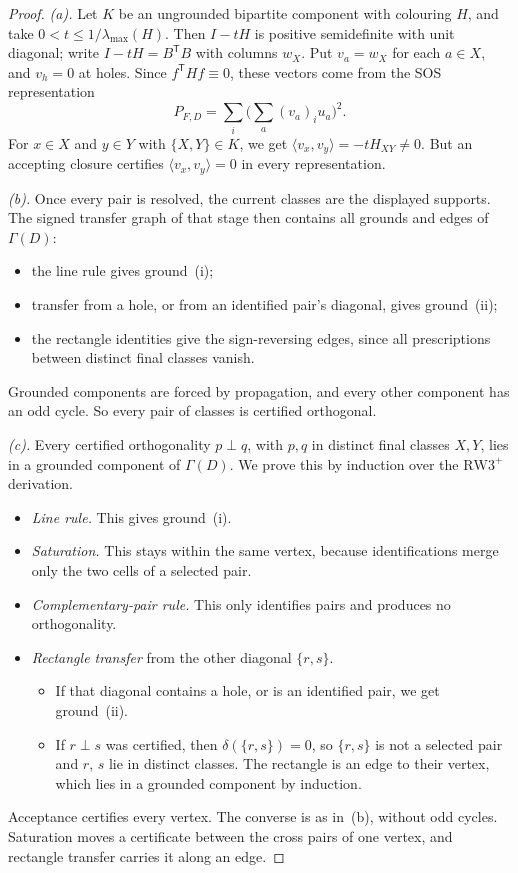 \documentclass[11pt,a4paper]{article}
\theoremstyle{definition}
\newcommand{\RW}{\mathrm{RW3}^{+}}
\begin{document}
\begin{proof}
\emph{(a).} Let $K$ be an ungrounded bipartite component with colouring
$H$, and take $0<t\le1/\lambda_{\max}(H)$. Then $I-tH$ is positive
semidefinite with unit diagonal; write $I-tH=B^{\mathsf T}B$ with columns
$w_X$. Put $v_a=w_X$ for each $a\in X$, and $v_h=0$ at holes. Since
$f^{\mathsf T}Hf\equiv0$, these vectors come from the SOS representation
\[
 P_{F,D}=\sum_i\bigl(\textstyle\sum_a(v_a)_iu_a\bigr)^2 .
\]
For $x\in X$ and $y\in Y$ with $\{X,Y\}\in K$, we get
$\langle v_x,v_y\rangle=-tH_{XY}\ne0$. But an accepting closure
certifies $\langle v_x,v_y\rangle=0$ in every representation.

\emph{(b).} Once every pair is resolved, the current classes are the
displayed supports. The signed transfer graph of that stage then contains
all grounds and edges of $\Gamma(D)$:
\begin{itemize}
\item the line rule gives ground~(i);
\item transfer from a hole, or from an identified pair's diagonal, gives
      ground~(ii);
\item the rectangle identities give the sign-reversing edges, since all
      prescriptions between distinct final classes vanish.
\end{itemize}
Grounded components are forced by propagation, and every other component
has an odd cycle. So every pair of classes is certified orthogonal.

\emph{(c).} Every certified orthogonality $p\perp q$, with $p,q$ in
distinct final classes $X,Y$, lies in a grounded component of $\Gamma(D)$.
We prove this by induction over the $\RW$ derivation.
\begin{itemize}
\item \emph{Line rule.} This gives ground~(i).
\item \emph{Saturation.} This stays within the same vertex, because
      identifications merge only the two cells of a selected pair.
\item \emph{Complementary-pair rule.} This only identifies pairs and
      produces no orthogonality.
\item \emph{Rectangle transfer} from the other diagonal $\{r,s\}$.
      \begin{itemize}
      \item If that diagonal contains a hole, or is an identified pair, we
            get ground~(ii).
      \item If $r\perp s$ was certified, then $\delta(\{r,s\})=0$, so
            $\{r,s\}$ is not a selected pair and $r$, $s$ lie in distinct
            classes. The rectangle is an edge to their vertex, which lies in
            a grounded component by induction.
      \end{itemize}
\end{itemize}
Acceptance certifies every vertex. The converse is as in~(b), without
odd cycles. Saturation moves a certificate between the cross pairs of one
vertex, and rectangle transfer carries it along an edge.


\end{proof}
\end{document}
